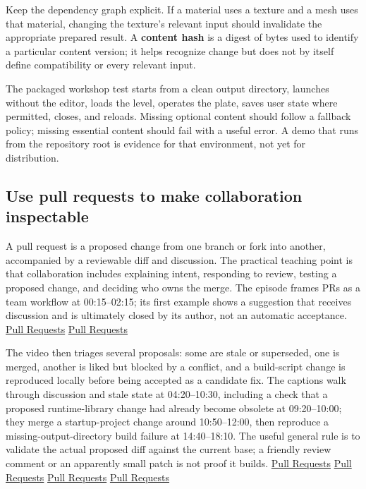 Keep the dependency graph explicit. If a material uses a texture and a mesh uses that material, changing the texture's relevant input should invalidate the appropriate prepared result. A \textbf{content hash} is a digest of bytes used to identify a particular content version; it helps recognize change but does not by itself define compatibility or every relevant input.

The packaged workshop test starts from a clean output directory, launches without the editor, loads the level, operates the plate, saves user state where permitted, closes, and reloads. Missing optional content should follow a fallback policy; missing essential content should fail with a useful error. A demo that runs from the repository root is evidence for that environment, not yet for distribution.

\subsection{Use pull requests to make collaboration inspectable}\label{06-engine-ii-ch040-use-pull-requests-to-make-collaboration-inspectable}

\hypertarget{06-engine-ii-ch040-use-pull-requests-to-make-collaboration-inspectable}{}

A pull request is a proposed change from one branch or fork into another, accompanied by a reviewable diff and discussion. The practical teaching point is that collaboration includes explaining intent, responding to review, testing a proposed change, and deciding who owns the merge. The episode frames PRs as a team workflow at 00:15--02:15; its first example shows a suggestion that receives discussion and is ultimately closed by its author, not an automatic acceptance. \href{https://www.youtube.com/watch?v=h0OgLT6KJi8&t=15s}{Pull Requests} \href{https://www.youtube.com/watch?v=h0OgLT6KJi8&t=210s}{Pull Requests}

The video then triages several proposals: some are stale or superseded, one is merged, another is liked but blocked by a conflict, and a build-script change is reproduced locally before being accepted as a candidate fix. The captions walk through discussion and stale state at 04:20--10:30, including a check that a proposed runtime-library change had already become obsolete at 09:20--10:00; they merge a startup-project change around 10:50--12:00, then reproduce a missing-output-directory build failure at 14:40--18:10. The useful general rule is to validate the actual proposed diff against the current base; a friendly review comment or an apparently small patch is not proof it builds. \href{https://www.youtube.com/watch?v=h0OgLT6KJi8&t=260s}{Pull Requests} \href{https://www.youtube.com/watch?v=h0OgLT6KJi8&t=560s}{Pull Requests} \href{https://www.youtube.com/watch?v=h0OgLT6KJi8&t=650s}{Pull Requests} \href{https://www.youtube.com/watch?v=h0OgLT6KJi8&t=880s}{Pull Requests}

